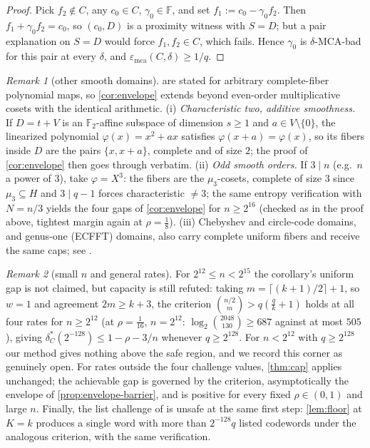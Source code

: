 \documentclass[11pt]{amsart}
\theoremstyle{definition}
\theoremstyle{remark}
\newtheorem{remark}[remark]{Remark}
\newcommand{\F}{\mathbb{F}}
\newcommand{\emca}{\varepsilon_{\mathrm{mca}}}
\begin{document}
\begin{proof}
Pick $f_2\notin C$, any $c_0\in C$, $\gamma_0\in\F$, and set $f_1:=c_0-\gamma_0f_2$. Then $f_1+\gamma_0f_2=c_0$, so $(c_0,D)$ is a proximity witness with $S=D$; but a pair explanation on $S=D$ would force $f_1,f_2\in C$, which fails. Hence $\gamma_0$ is $\delta$-MCA-bad for this pair at every $\delta$, and $\emca(C,\delta)\ge1/q$.
\end{proof}

\begin{remark}[other smooth domains]\label{rem:instantiations}
 are stated for arbitrary complete-fiber polynomial maps, so \cref{cor:envelope} extends beyond even-order multiplicative cosets with the identical arithmetic. (i) \emph{Characteristic two, additive smoothness.} If $D=t+V$ is an $\F_2$-affine subspace of dimension $s\ge1$ and $a\in V\setminus\{0\}$, the linearized polynomial $\varphi(x)=x^2+ax$ satisfies $\varphi(x+a)=\varphi(x)$, so its fibers inside $D$ are the pairs $\{x,x+a\}$, complete and of size $2$; the proof of \cref{cor:envelope} then goes through verbatim. (ii) \emph{Odd smooth orders.} If $3\mid n$ (e.g.\ $n$ a power of $3$), take $\varphi=X^3$: the fibers are the $\mu_3$-cosets, complete of size $3$ since $\mu_3\subseteq H$ and $3\mid q-1$ forces characteristic $\ne3$; the same entropy verification with $N=n/3$ yields the four gaps of \cref{cor:envelope} for $n\ge2^{16}$ (checked as in the proof above, tightest margin again at $\rho=\tfrac18$). (iii) Chebyshev and circle-code domains, and genus-one (ECFFT) domains, also carry complete uniform fibers and receive the same caps; see \cite{Cho26b}.
\end{remark}

\begin{remark}[small $n$ and general rates]\label{rem:small-n}
For $2^{12}\le n<2^{15}$ the corollary's uniform gap is not claimed, but capacity is still refuted: taking $m=\lceil(k+1)/2\rceil+1$, so $w=1$ and agreement $2m\ge k+3$, the criterion $\binom{n/2}m>q(\frac qk+1)$ holds at all four rates for $n\ge2^{12}$ (at $\rho=\tfrac1{16}$, $n=2^{12}$: $\log_2\binom{2048}{130}\ge687$ against at most $505$), giving $\delta^*_C(2^{-128})\le1-\rho-3/n$ whenever $q\ge2^{128}$. For $n<2^{12}$ with $q\ge2^{128}$ our method gives nothing above the safe region, and we record this corner as genuinely open. For rates outside the four challenge values, \cref{thm:cap} applies unchanged; the achievable gap is governed by the criterion, asymptotically the envelope of \cref{prop:envelope-barrier}, and is positive for every fixed $\rho\in(0,1)$ and large $n$. Finally, the list challenge of \cite{ABF26} is unsafe at the same first step: \cref{lem:floor} at $K=k$ produces a single word with more than $2^{-128}q$ listed codewords under the analogous criterion, with the same verification.
\end{remark}
\end{document}
